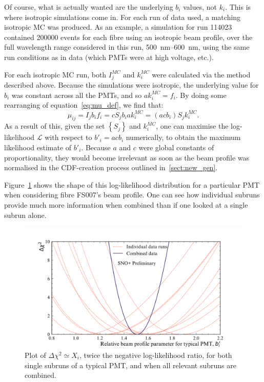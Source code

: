 Of course, what is actually wanted are the underlying $b_{i}$ values, not $k_{i}$. This is where isotropic simulations come in. For each run of data used, a matching isotropic MC was produced. As an example, a simulation for run \num{114023} contained \num{200000} events for each fibre using an isotropic beam profile, over the full wavelength range considered in this run, \SIrange{500}{600}{\nano\metre}, using the same run conditions as in data (which PMTs were at high voltage, etc.).

For each isotropic MC run, both $I_{j}^{MC}$ and $k_{i}^{MC}$ were calculated via the method described above. Because the simulations were isotropic, the underlying value for $b_{i}$ was constant across all the PMTs, and so $ak_{i}^{MC} = f_{i}$. By doing some rearranging of equation~\ref{eq:mu_def}, we find that:
\begin{equation}
    \mu_{ij} = I_{j}b_{i}f_{i} = cS_{j}b_{i}ak_{i}^{MC} = (acb_{i})S_{j}k_{i}^{MC}.
\end{equation}
As a result of this, given the set $\left\{S_{j}\right\}$ and $k_{i}^{MC}$, one can maximise the log-likelihood $\mathcal{L}$ with respect to $b'_{i} = acb_{i}$ numerically, to obtain the maximum likelihood estimate of $b'_{i}$. Because $a$ and $c$ were global constants of proportionality, they would become irrelevant as soon as the beam profile was normalised in the CDF-creation process outlined in~\ref{sect:new_gen}.

Figure~\ref{fig:likelihood_scan} shows the shape of this log-likelihood distribution for a particular PMT when considering fibre FS007's beam profile. One can see how individual subruns provide much more information when combined than if one looked at a single subrun alone.

\begin{figure}
    \centering
    \includegraphics[width=0.8\linewidth]{4_SMELLIESimulation/images/example_likelihood_distribution_pmt_inc_all_subruns_proper_formatting.pdf}
    \caption[Plot of $\Delta\chi^2$ for both single subruns of a typical PMT, and when all relevant subruns are combined]{Plot of $\Delta\chi^2\simeq X_{i}$, twice the negative log-likelihood ratio, for both single subruns of a typical PMT, and when all relevant subruns are combined.}
    \label{fig:likelihood_scan}
\end{figure}

